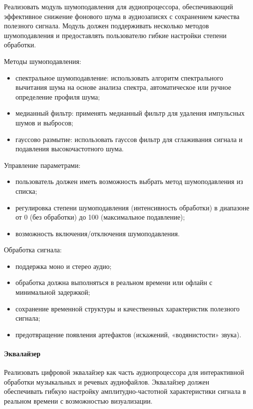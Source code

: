 Реализовать модуль шумоподавления для аудиопроцессора, обеспечивающий эффективное снижение фонового шума в аудиозаписях с сохранением качества полезного сигнала. Модуль должен поддерживать несколько методов шумоподавления и предоставлять пользователю гибкие настройки степени обработки.

Методы шумоподавления:
\begin{itemize}
	\item спектральное шумоподавление: использовать алгоритм спектрального вычитания шума на основе анализа спектра, автоматическое или ручное определение профиля шума;
	\item медианный фильтр: применять медианный фильтр для удаления импульсных шумов и выбросов;
	\item гауссово размытие: использовать гауссов фильтр для сглаживания сигнала и подавления высокочастотного шума.
\end{itemize}

Управление параметрами:
\begin{itemize}
	\item пользователь должен иметь возможность выбрать метод шумоподавления из списка;
	\item регулировка степени шумоподавления (интенсивность обработки) в диапазоне от 0 (без обработки) до 100 (максимальное подавление);
	\item возможность включения/отключения шумоподавления.
\end{itemize}

Обработка сигнала:
\begin{itemize}
	\item поддержка моно и стерео аудио;
	\item обработка должна выполняться в реальном времени или офлайн с минимальной задержкой;
	\item сохранение временной структуры и качественных характеристик полезного сигнала;
	\item предотвращение появления артефактов (искажений, «водянистости» звука).
\end{itemize}

\paragraph{Эквалайзер}

Реализовать цифровой эквалайзер как часть аудиопроцессора для интерактивной обработки музыкальных и речевых аудиофайлов. Эквалайзер должен обеспечивать гибкую настройку амплитудно-частотной характеристики сигнала в реальном времени с возможностью визуализации.


